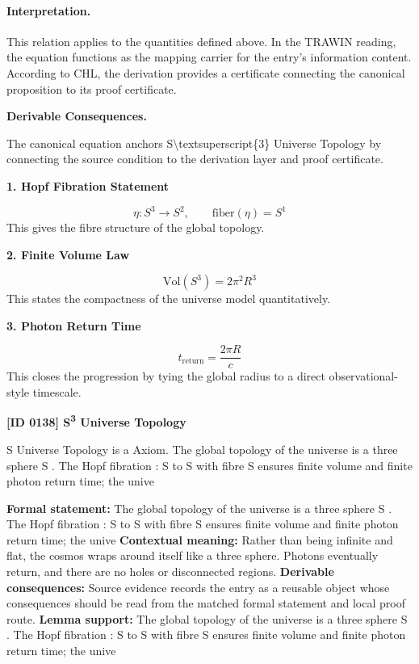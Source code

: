 \paragraph{Interpretation.}
This relation applies to the quantities defined above. In the TRAWIN reading, the equation functions as the mapping carrier for the entry’s information content. According to CHL, the derivation provides a certificate connecting the canonical proposition to its proof certificate.

\par\vspace{0.35em}
\noindent\textbf{Derivable Consequences.}\quad
\begingroup
\footnotesize
\raggedright
The canonical equation anchors S\textbackslash{}textsuperscript\{3\} Universe Topology by connecting the source condition to the derivation layer and proof certificate.
\par\endgroup

\noindent\textbf{1. Hopf Fibration Statement}\par
\[
\eta:S^3\to S^2,
\qquad
\mathrm{fiber}(\eta)=S^1
\]
\noindent This gives the fibre structure of the global topology.\par
\noindent\textbf{2. Finite Volume Law}\par
\[
\mathrm{Vol}(S^3)=2\pi^2 R^3
\]
\noindent This states the compactness of the universe model quantitatively.\par
\noindent\textbf{3. Photon Return Time}\par
\[
t_{\mathrm{return}}=\frac{2\pi R}{c}
\]
\noindent This closes the progression by tying the global radius to a direct observational-style timescale.\par

\clearpage
\noindent\textbf{[ID 0138] S\textsuperscript{3} Universe Topology}\par
\vspace{0.35em}
\begingroup\small
{}
S  Universe Topology is a Axiom. The global topology of the universe is a three sphere S . The Hopf fibration  : S  to S  with fibre S  ensures finite volume and finite photon return time; the unive

\begingroup\footnotesize\setlength{\emergencystretch}{3em}\sloppy
\textbf{Formal statement:} The global topology of the universe is a three sphere S . The Hopf fibration  : S  to S  with fibre S  ensures finite volume and finite photon return time; the unive
\textbf{Contextual meaning:} Rather than being infinite and flat, the cosmos wraps around itself like a three sphere. Photons eventually return, and there are no holes or disconnected regions.
\textbf{Derivable consequences:} Source evidence records the entry as a reusable object whose consequences should be read from the matched formal statement and local proof route.
\textbf{Lemma support:} The global topology of the universe is a three sphere S . The Hopf fibration  : S  to S  with fibre S  ensures finite volume and finite photon return time; the unive\par
\endgroup

